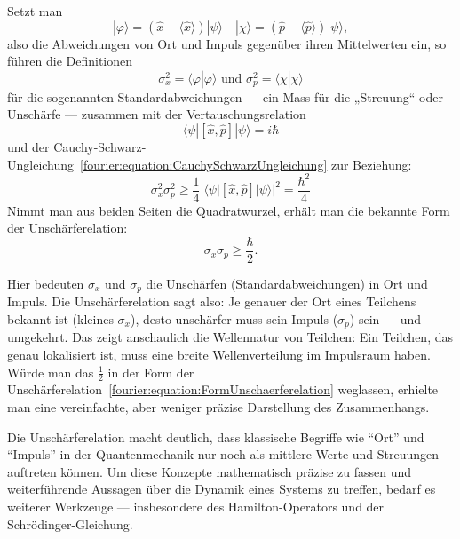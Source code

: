 		Setzt man
		\begin{equation}
			|\varphi\rangle = (\hat{x} - \langle \hat{x} \rangle) |\psi\rangle \quad |\chi\rangle = (\hat{p} - \langle \hat{p} \rangle) | \psi\rangle,
		\end{equation}
		also die Abweichungen von Ort und Impuls gegenüber ihren Mittelwerten ein, so führen die Definitionen
		\begin{equation}
			\sigma_x^2 = \langle\varphi | \varphi\rangle \text{ und } \sigma_p^2 = \langle\chi | \chi\rangle
		\end{equation}
		für die sogenannten Standardabweichungen --- ein Mass für die „Streuung“ oder Unschärfe --- zusammen mit der Vertauschungsrelation
		\begin{equation}
			\langle\psi | [\hat{x},\hat{p}] | \psi\rangle = i\hbar
		\end{equation}
		und der Cauchy-Schwarz-Ungleichung~\ref{fourier:equation:CauchySchwarzUngleichung} zur Beziehung:
		\begin{equation}
			\sigma_x^2 \sigma_p^2 \ge \frac{1}{4} |\langle\psi | [\hat{x},\hat{p}] | \psi\rangle|^2 = \frac{\hbar^2}{4}
		\end{equation}
		Nimmt man aus beiden Seiten die Quadratwurzel, erhält man die bekannte Form der Unschärferelation:
		\begin{equation}\label{fourier:equation:FormUnschaerferelation}
			\sigma_x \sigma_p \ge \frac{\hbar}{2}.
		\end{equation}

		Hier bedeuten $\sigma_x$ und $\sigma_p$ die Unschärfen (Standardabweichungen) in Ort und Impuls.
		Die Unschärferelation sagt also:
		Je genauer der Ort eines Teilchens bekannt ist (kleines $\sigma_x$), desto unschärfer muss sein Impuls ($\sigma_p$) sein --- und umgekehrt.
		Das zeigt anschaulich die Wellennatur von Teilchen:
		Ein Teilchen, das genau lokalisiert ist, muss eine breite Wellenverteilung im Impulsraum haben.
		Würde man das $\tfrac{1}{2}$ in der Form der Unschärferelation~\ref{fourier:equation:FormUnschaerferelation} weglassen, erhielte man eine vereinfachte, aber weniger präzise Darstellung des Zusammenhangs.

		Die Unschärferelation macht deutlich, dass klassische Begriffe wie ``Ort'' und ``Impuls'' in der Quantenmechanik nur noch als mittlere Werte und Streuungen auftreten können.
		Um diese Konzepte mathematisch präzise zu fassen und weiterführende Aussagen über die Dynamik eines Systems zu treffen, bedarf es weiterer Werkzeuge ---
		insbesondere des Hamilton-Operators und der Schrödinger-Gleichung.

